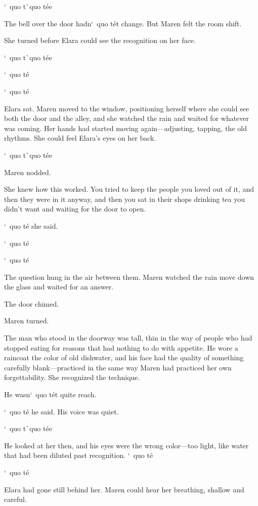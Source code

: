 \documentclass[12pt,letterpaper,openany]{book}
\begin{document}
`\ quo t\`\ quo t\'e{}e{}
\par
The bell over the door hadn`\ quo t\'e{}t change. But Maren felt the room shift.
\par
She turned before Elara could see the recognition on her face.
\par
`\ quo t\`\ quo t\'e{}e{}
\par
`\ quo t\'e{}
\par
`\ quo t\'e{}
\par
Elara sat. Maren moved to the window, positioning herself where she could see both the door and the alley, and she watched the rain and waited for whatever was coming. Her hands had started moving again—adjusting, tapping, the old rhythms. She could feel Elara's eyes on her back.
\par
`\ quo t\`\ quo t\'e{}e{}
\par
Maren nodded.
\par
She knew how this worked. You tried to keep the people you loved out of it, and then they were in it anyway, and then you sat in their shops drinking tea you didn't want and waiting for the door to open.
\par
`\ quo t\'e{} she said.
\par
`\ quo t\'e{}
\par
`\ quo t\'e{}
\par
The question hung in the air between them. Maren watched the rain move down the glass and waited for an answer.
\par
The door chimed.
\par
Maren turned.
\par
The man who stood in the doorway was tall, thin in the way of people who had stopped eating for reasons that had nothing to do with appetite. He wore a raincoat the color of old dishwater, and his face had the quality of something carefully blank—practiced in the same way Maren had practiced her own forgettability. She recognized the technique.
\par
He wasn`\ quo t\'e{}t quite reach.
\par
`\ quo t\'e{} he said. His voice was quiet.
\par
`\ quo t\`\ quo t\'e{}e{}
\par
He looked at her then, and his eyes were the wrong color—too light, like water that had been diluted past recognition. `\ quo t\'e{}
\par
`\ quo t\'e{}
\par
Elara had gone still behind her. Maren could hear her breathing, shallow and careful.
\end{document}
